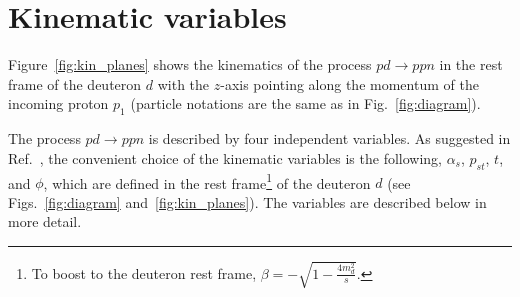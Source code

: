 \section{Kinematic variables}

Figure~\ref{fig:kin_planes} shows the kinematics of the process $pd\rightarrow ppn$ in the rest frame of the deuteron $d$ with the $z$-axis pointing along the momentum of the incoming proton $p_{1}$ (particle notations are the same as in Fig.~\ref{fig:diagram}).

The process $pd\rightarrow ppn$ is described by four independent variables. As suggested in Ref.~\cite{PhysRevC.107.014605}, the convenient choice of the kinematic variables is the following, $\alpha_s$, $p_{st}$, $t$, and $\phi$, which are defined in the rest frame\footnote[1]{To boost to the deuteron rest frame, $\beta=-\sqrt{1-\frac{4m_{d}^2}{s}}$.} of the deuteron $d$ (see Figs.~\ref{fig:diagram} and~\ref{fig:kin_planes}). The variables are described below in more detail.

